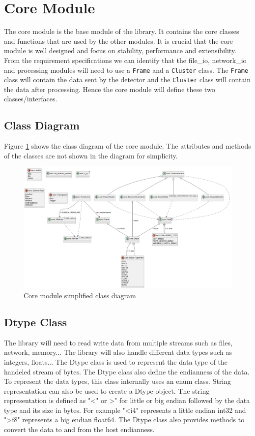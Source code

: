 \documentclass[./chapitre3.tex]{subfiles}
\begin{document}
\section{Core Module}
The core module is the base module of the library. It contains the core classes and functions
that are used by the other modules. It is crucial that the core module is well designed and
focus on stability, performance and extensibility. From the requirement specifications we can
identify that the file\_io, network\_io and processing modules will need to use a \lstinline|Frame| and a
\lstinline|Cluster| class. The \lstinline|Frame| class will contain the data sent by the detector and the \lstinline|Cluster| class
will contain the data after processing. Hence the core module will define these two classes/interfaces.\\

\subsection{Class Diagram}
Figure \ref{fig:core_class_diagram} shows the class diagram of the core module. The attributes
and methods of the classes are not shown in the diagram for simplicity.

\begin{figure}
    \centering
    \includegraphics[width=\textwidth]{Chapitre3/figures/core_class_simplified.png}
    \caption{Core module simplified class diagram}
    \label{fig:core_class_diagram}
\end{figure}
\subsection{Dtype Class}
The library will need to read write data from multiple streams such as files, network, memory...
The library will also handle different data types such as integers, floats... The Dtype class
is used to represent the data type of the handeled stream of bytes. The Dtype class also
define the endianness of the data. To represent the data types, this class internally uses an enum
class. String representation can also be used to create a Dtype object. The string representation
is defined as "\textless" or \textgreater" for little or big endian followed by the data type and its size in bytes.
For example "\textless i4" represents a little endian int32 and "\textgreater f8" represents a big endian float64.
The Dtype class also provides methods to convert the data to and from the host endianness.\\
\end{document}
